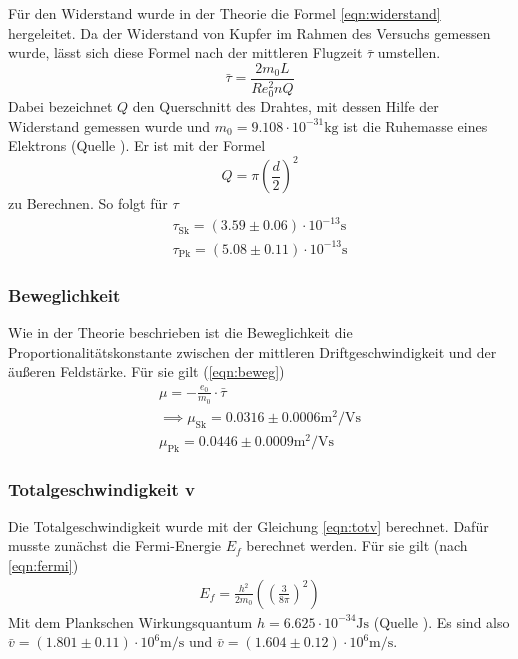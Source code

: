 Für den Widerstand wurde in der Theorie die Formel \eqref{eqn:widerstand} hergeleitet. Da der Widerstand
von Kupfer im Rahmen des Versuchs gemessen wurde, lässt sich diese Formel nach
der mittleren Flugzeit $\bar{\tau}$ umstellen.
\begin{equation*}
\bar{\tau} = \frac{2 m_0 L}{R e_0^2 n Q}
\end{equation*}
Dabei bezeichnet $Q$ den Querschnitt des Drahtes, mit dessen Hilfe der Widerstand gemessen wurde und 
$m_0 = 9.108 \cdot 10^{-31}\si{\kg}$ ist die Ruhemasse eines Elektrons (Quelle \cite{m0}).
Er ist mit der Formel
\begin{equation}
Q = \pi \left( \frac{d}{2} \right)^2
\end{equation}
zu Berechnen. So folgt für $\tau$
\begin{align*}
\tau_\text{Sk} = \left( 3.59 \pm 0.06 \right) \cdot 10^{-13} \si{\s}\\
\tau_\text{Pk} = \left( 5.08 \pm 0.11 \right) \cdot 10^{-13} \si{\s}
\end{align*}

\subsubsection{Beweglichkeit}

Wie in der Theorie beschrieben ist die Beweglichkeit die Proportionalitätskonstante zwischen 
der mittleren Driftgeschwindigkeit und der äußeren Feldstärke. Für sie gilt (\eqref{eqn:beweg})
\begin{align*}
\mu = -\frac{e_0}{m_0} \cdot \bar{\tau} \\
\implies \mu_\text{Sk} = 0.0316 \pm 0.0006 \si{\m\squared\per\V\s} \\
\mu_\text{Pk} = 0.0446 \pm 0.0009 \si{\m\squared\per\V\s}
\end{align*}

\subsubsection{Totalgeschwindigkeit v}

Die Totalgeschwindigkeit wurde mit der Gleichung \eqref{eqn:totv} berechnet.
Dafür musste zunächst die Fermi-Energie $E_f$ berechnet werden. Für sie gilt (nach \eqref{eqn:fermi})
\begin{align*}
E_f = \frac{h^2}{2 m_0} \left( \left( \frac{3}{8 \pi} \right)^2 \right)
\end{align*}
Mit dem Plankschen Wirkungsquantum $h = 6.625 \cdot 10^{-34}\si{\joule\s}$ (Quelle \cite{Planck}).
Es sind also $\bar{v} = \left( 1.801 \pm 0.11 \right) \cdot 10^{6} \si{\m\per\s}$ und 
$\bar{v} = \left( 1.604 \pm 0.12 \right) \cdot 10^{6} \si{\m\per\s}$.

